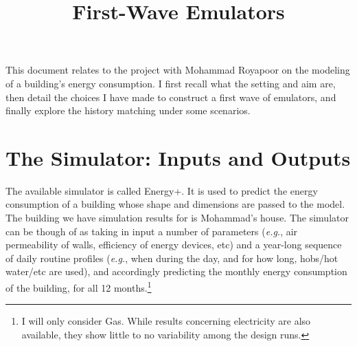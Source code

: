 \documentclass[a4paper, 12pt]{article}
\title{First-Wave Emulators}
\author{}
\date{}
\newcommand{\eg}{\textit{e.g.}}
\begin{document}
\maketitle

\thispagestyle{empty}

\tableofcontents
\newpage

\setcounter{page}{1} 

\maketitle
\vspace{-9ex}

This document relates to the project with Mohammad Royapoor on the modeling of a building's energy consumption. I first recall what the setting and aim are, then detail the choices I have made to construct a first wave of emulators, and finally explore the history matching under some scenarios.


\section{The Simulator: Inputs and Outputs}
The available simulator is called Energy+. It is used to predict the energy consumption of a building whose shape and dimensions are passed to the model. The building we have simulation results for is Mohammad's house.
The simulator can be though of as taking in input a number of parameters (\eg, air permeability of walls, efficiency of energy devices, etc) and a year-long sequence of daily routine profiles (\eg, when during the day, and for how long, hobs/hot water/etc are used), and accordingly predicting the monthly energy consumption of the building, for all 12 months.\footnote{ I will only consider Gas. While results concerning electricity are also available, they show little to no variability among the design runs.}
\end{document}
